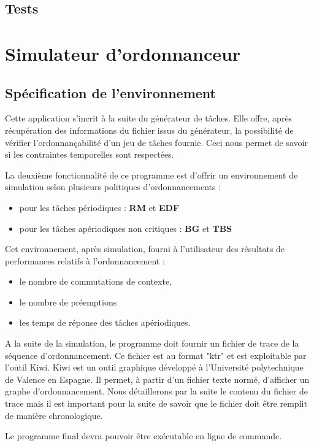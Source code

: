 \section{Tests}



\chapter{Simulateur d'ordonnanceur}
	\section{Spécification de l’environnement}
		Cette application s'incrit à la suite du générateur de tâches. Elle offre, après récupération des informations du fichier issus du générateur, la possibilité de vérifier l'ordonnançabilité d'un jeu de tâches fournie. Ceci nous permet de savoir si les contraintes temporelles sont respectées. 

	La deuxième fonctionnalité de ce programme est d'offrir un environnement de simulation selon plusieurs politiques d'ordonnancements :
	\begin{itemize}
		\item pour les tâches périodiques : \textbf{RM} et \textbf{EDF}
		\item pour les tâches apériodiques non critiques :  \textbf{BG} et \textbf{TBS}
	\end{itemize}
	Cet environnement, après simulation, fourni à l'utilisateur des résultats de performances relatifs à l'ordonnancement : 
	\begin{itemize}
		\item le nombre de commutations de contexte,
		\item le nombre de préemptions
		\item les temps de réponse des tâches apériodiques.
	\end{itemize}
	
	A la suite de la simulation, le programme doit fournir un fichier de trace de la séquence d'ordonnancement. Ce fichier est au format "ktr" et est exploitable par l'outil Kiwi. 
	Kiwi est un outil graphique développé à l'Université polytechnique de Valence en Espagne. Il permet, à partir d'un fichier texte normé, d'afficher un graphe d'ordonnancement. Nous détaillerons par la suite le contenu du fichier de trace mais il est important pour la suite de savoir que le fichier doit être remplit de manière chronologique.
		
	Le programme final devra pouvoir être exécutable en ligne de commande.\\
		
